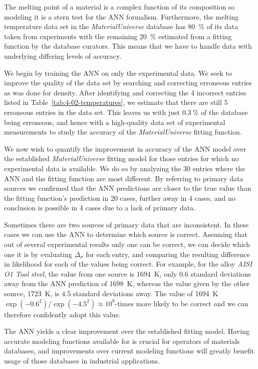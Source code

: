\documentclass[review]{elsarticle}
\newcommand{\tabref}[1]{Table~\ref{#1}}
\begin{document}
The melting point of a material is a complex function of its composition so
modeling it is a stern test for the ANN formalism. Furthermore, the melting
temperature data set in the \textit{MaterialUniverse} database has
\SI{80}{\percent} of its data taken from experiments with the remaining
\SI{20}{\percent} estimated from a fitting function by the database
curators. This means that we have to handle data with underlying differing
levels of accuracy.

We begin by training the ANN on only the experimental data. We seek to
improve the quality of the data set by searching and correcting erroneous
entries as was done for density. After identifying and correcting the 4
incorrect entries listed in \tabref{tab:4-02-temperatures}, we estimate that
there are still 5 erroneous entries in the data set. This leaves us with
just $\SI{0.3}{\percent}$ of the database being erroneous, and hence with a
high-quality data set of experimental measurements to study the accuracy of
the \textit{MaterialUniverse} fitting function.

We now wish to quantify the improvement in accuracy of the ANN model over
the established \textit{MaterialUniverse} fitting model for those entries
for which no experimental data is available. We do so by analyzing the 30
entries where the ANN and the fitting function are most different. By
referring to primary data sources we confirmed that the ANN predictions are
closer to the true value than the fitting function's prediction in 20 cases,
further away in 4 cases, and no conclusion is possible in 4 cases due to a
lack of primary data.

Sometimes there are two sources of primary data that are inconsistent.  In
these cases we can use the ANN to determine which source is
correct. Assuming that out of several experimental results only one can be
correct, we can decide which one it is by evaluating $\Delta_\sigma$ for
each entry, and comparing the resulting difference in likelihood for each of
the values being correct. For example, for the alloy \textit{AISI O1 Tool
  steel}, the value from one source is \SI{1694}{\kelvin}, only \num{0.6}
standard deviations away from the ANN prediction of \SI{1698}{\kelvin},
whereas the value given by the other source, \SI{1723}{\kelvin}, is
\num{4.5} standard deviations away.  The value of \SI{1694}{\kelvin}
$\exp{(-0.6^2)}/\exp{(-4.5^2)}\approx10^9$-times more likely to be correct
and we can therefore confidently adopt this value.

The ANN yields a clear improvement over the established fitting
model. Having accurate modeling functions available for is crucial for
operators of materials databases, and improvements over current modeling
functions will greatly benefit usage of those databases in industrial
applications.
\end{document}
